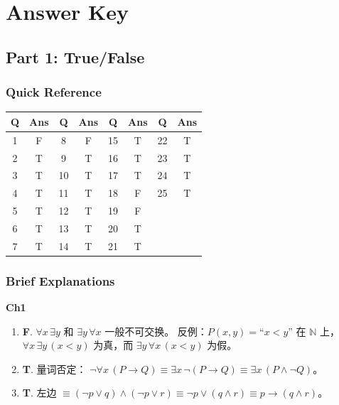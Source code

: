 \documentclass[11pt,a4paper,fontset=mac]{ctexart}
\begin{document}
\newpage
\section*{Answer Key}

\subsection*{Part 1: True/False}

\subsubsection*{Quick Reference}

\medskip
\noindent
\begin{tabular}{c|c|c|c|c|c|c|c}
\toprule
Q & Ans & Q & Ans & Q & Ans & Q & Ans \\
\midrule
1  & F & 8  & F & 15 & T & 22 & T \\
2  & T & 9  & T & 16 & T & 23 & T \\
3  & T & 10 & T & 17 & T & 24 & T \\
4  & T & 11 & T & 18 & F & 25 & T \\
5  & T & 12 & T & 19 & F &    &   \\
6  & T & 13 & T & 20 & T &    &   \\
7  & T & 14 & T & 21 & T &    &   \\
\bottomrule
\end{tabular}

\subsubsection*{Brief Explanations}

\medskip
\noindent\textbf{Ch1}
\begin{enumerate}[leftmargin=*,label={\textbf{Q\arabic*}.},wide,itemsep=0pt]

\item[\textbf{Q1}] \textbf{F}.  $\forall x\,\exists y$ 和 $\exists y\,\forall x$ 一般不可交换。
  反例：$P(x,y) = \text{``$x<y$''}$ 在 $\mathbb{N}$ 上，
  $\forall x\,\exists y\,(x<y)$ 为真，而 $\exists y\,\forall x\,(x<y)$ 为假。

\item[\textbf{Q2}] \textbf{T}.  量词否定：
  $\neg\forall x\,(P\to Q)\equiv\exists x\,\neg(P\to Q)\equiv\exists x\,(P\land\neg Q)$。

\item[\textbf{Q3}] \textbf{T}.
  左边 $\equiv(\neg p\lor q)\land(\neg p\lor r)\equiv\neg p\lor(q\land r)\equiv p\to(q\land r)$。

\end{enumerate}
\end{document}
